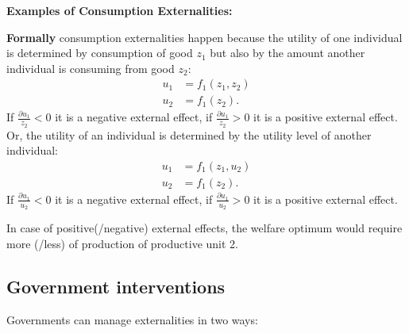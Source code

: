 \textbf{Examples of Consumption Externalities:}

\textbf{Formally} consumption externalities happen because the utility of one individual is determined by consumption of good $z_1$ but also by the amount another individual is consuming from good $z_2$:
\begin{align*}
	u_1&=f_1(z_1,z_2)\\
	u_2&=f_1(z_2).
\end{align*}
If $\frac{\partial u_1}{z_2}<0$ it is a negative external effect, if $\frac{\partial u_1}{z_2}>0$ it is a positive external effect.
Or, the utility of an individual is determined by the utility level of another individual:
\begin{align*}
	u_1&=f_1(z_1,u_2)\\
	u_2&=f_1(z_2).
\end{align*}
If $\frac{\partial u_1}{u_2}<0$ it is a negative external effect, if $\frac{\partial u_1}{u_2}>0$ it is a positive external effect.


In case of positive(/negative) external effects, the welfare optimum would require more (/less) of production of productive unit 2.


\subsection{Government interventions}

Governments can manage externalities in two ways:

